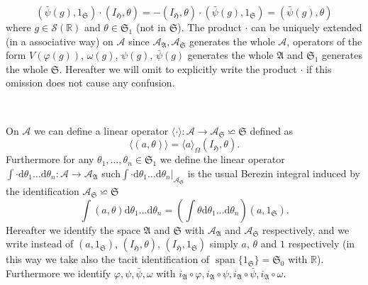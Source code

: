 \documentclass[a4paper,10pt]{article}
\newcommand{\mathd}{\mathrm{d}}
\newcommand{\tmop}[1]{\ensuremath{\operatorname{#1}}}
\begin{document}
\[ (\bar{\psi} (g), 1_{\mathfrak{S}}) \cdot (I_{\mathfrak{H}}, \theta) = -
   (I_{\mathfrak{H}}, \theta) \cdot (\bar{\psi} (g), 1_{\mathfrak{S}}) =
   (\bar{\psi} (g), \theta) \]
where $g \in \mathcal{S} (\mathbb{R})$ and $\theta \in \mathfrak{S}_1$ (not in
$\mathfrak{S}$). The product $\cdot$ can be uniquely extended (in a
associative way) on $\mathcal{A}$ since $\mathcal{A}_{\mathfrak{A}},
\mathcal{A}_{\mathfrak{S}}$ generates the whole $\mathcal{A}$, operators of
the form $V (\varphi (g))$, $\omega (g)$, $\psi (g)$, $\bar{\psi} (g)$
generates the whole $\mathfrak{A}$ and $\mathfrak{S}_1$ generates the whole
$\mathfrak{S}$. Hereafter we will omit to explicitly write the product $\cdot$
if this omission does not cause any confusion. \

\

On $\mathcal{A}$ we can define a linear operator $\langle \cdot \rangle :
\mathcal{A} \rightarrow \mathcal{A}_{\mathfrak{S}} \backsimeq \mathfrak{S}$
defined as
\[ \langle (a, \theta) \rangle = \langle a \rangle_{\Omega}
   (I_{\mathfrak{H}}, \theta) . \]
Furthermore for any $\theta_1, \ldots, \theta_n \in \mathcal{} \mathfrak{S}_1$
we define the linear operator $\int \cdot \mathd \theta_1 \ldots \mathd
\theta_n : \mathcal{A} \rightarrow \mathcal{A}_{\mathfrak{A}}$ such$\int \cdot
\mathd \theta_1 \ldots \mathd \theta_n |_{\mathcal{A}_{\mathfrak{S}}}$ is the
usual Berezin integral induced by the identification
$\mathcal{A}_{\mathfrak{S}} \backsimeq \mathfrak{S}$
\[ \int (a, \theta) \mathd \theta_1 \ldots \mathd \theta_n = \left( \int
   \theta \mathd \theta_1 \ldots \mathd \theta_n \right) (a, 1_{\mathfrak{S}})
   . \]
Hereafter we identify the space $\mathfrak{A}$ and $\mathfrak{S}$ with
$\mathcal{A}_{\mathfrak{A}}$ and $\mathcal{A}_{\mathfrak{S}}$ respectively,
and we write instead of $(a, 1_{\mathfrak{S}})$, $(I_{\mathfrak{H}}, \theta)$,
$(I_{\mathfrak{H}}, 1_{\mathfrak{S}})$ simply $a$, $\theta$ and $1$
respectively (in this way we take also the tacit identification of
$\tmop{span} \{ 1_{\mathfrak{S}} \} = \mathfrak{S}_0$ with $\mathbb{R}$).
Furthermore we identify $\varphi, \psi, \bar{\psi}, \omega$ with
$i_{\mathfrak{A}} \circ \varphi, i_{\mathfrak{A}} \circ \psi, i_{\mathfrak{A}}
\circ \bar{\psi}, i_{\mathfrak{A}} \circ \omega$.
\end{document}
